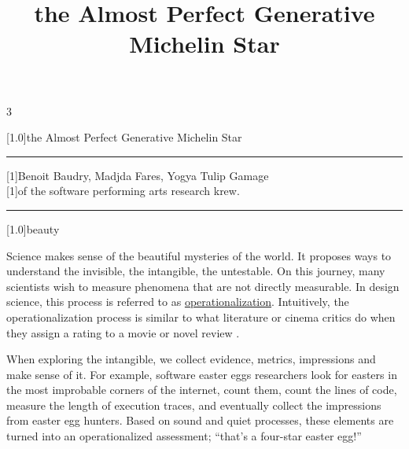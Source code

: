 \documentclass[11pt]{article}
\title{the Almost Perfect Generative Michelin Star}
\begin{document}
%
\begin{multicols}{3}
\begin{centering}
\Large \scalebox{1.2}[1.0]{the Almost Perfect Generative Michelin Star}

\vspace{3mm}

\rule[3pt]{2em}{0.7pt}

\vspace{2mm}

\large \scalebox{1.15}[1]{Benoit Baudry, Madjda Fares, Yogya Tulip Gamage}\\[2.5mm]
\scalebox{1.15}[1]{of the software performing arts research krew.}

\vspace{3mm}

\rule[3pt]{2em}{0.7pt}

\vspace{2mm}

\end{centering}

\openup 1.09mm
\begin{centering}
\large \scalebox{1.2}[1.0]{beauty}
    
\end{centering}

Science makes sense of the beautiful mysteries of the world. It proposes ways to understand the invisible, the intangible, the untestable. On this journey, many scientists wish to measure phenomena that are not directly measurable. In design science, this process is referred to as \href{https://en.wikipedia.org/wiki/Operationalization}{operationalization}. Intuitively, the operationalization process is similar to what literature or cinema critics do when they assign a rating to a movie or novel review \cite{niraj2015impact,maryl2023operationalising}. 

When exploring the intangible, we collect evidence, metrics, impressions and make sense of it. For example, software easter eggs researchers look for easters in the most improbable corners of the internet, count them, count the lines of code, measure the length of execution traces, and eventually collect the impressions from easter egg hunters. Based on sound and quiet processes, these elements are turned into an operationalized assessment; ``that's a four-star easter egg!''


\end{multicols}
\end{document}
